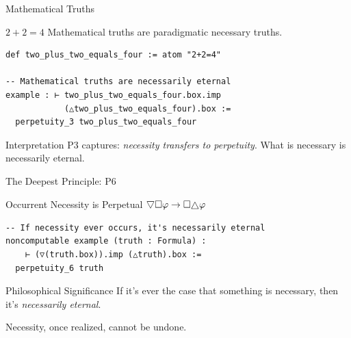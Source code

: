\documentclass[aspectratio=169,11pt]{beamer}
\newcommand{\nec}{\Box}
\newcommand{\always}{\ensuremath \raisebox{-1.3pt}{$\triangle$}}
\newcommand{\sometimes}{\ensuremath \raisebox{1.3pt}{\rotatebox[origin=c]{180}{$\triangle$}}}
\newcommand{\imp}{\rightarrow}
\begin{document}
\begin{frame}[fragile]{Mathematical Truths}

\begin{block}{$2 + 2 = 4$}
Mathematical truths are paradigmatic necessary truths.
\end{block}

\begin{lstlisting}
def two_plus_two_equals_four := atom "2+2=4"

-- Mathematical truths are necessarily eternal
example : ⊢ two_plus_two_equals_four.box.imp
            (△two_plus_two_equals_four).box :=
  perpetuity_3 two_plus_two_equals_four
\end{lstlisting}

\vspace{0.3cm}

\begin{block}{Interpretation}
P3 captures: \emph{necessity transfers to perpetuity}.
What is necessary is necessarily eternal.
\end{block}

\end{frame}

\begin{frame}[fragile]{The Deepest Principle: P6}

\begin{block}{Occurrent Necessity is Perpetual}
$\sometimes\nec\varphi \imp \nec\always\varphi$
\end{block}

\begin{lstlisting}
-- If necessity ever occurs, it's necessarily eternal
noncomputable example (truth : Formula) :
    ⊢ (▽(truth.box)).imp (△truth).box :=
  perpetuity_6 truth
\end{lstlisting}

\vspace{0.3cm}

\begin{alertblock}{Philosophical Significance}
If it's ever the case that something is necessary, then it's \emph{necessarily eternal}.

Necessity, once realized, cannot be undone.
\end{alertblock}

\end{frame}

\end{document}
